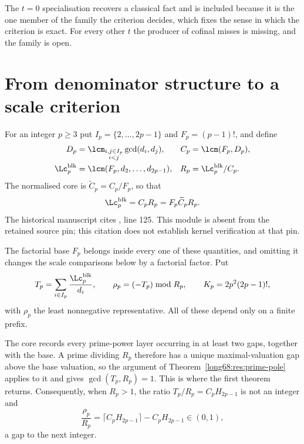 The $t=0$ specialisation recovers a classical fact and is included because it
is the one member of the family the criterion decides, which fixes the sense
in which the criterion is exact.  For every other $t$ the
producer of cofinal misses is missing, and the family is open.

\section{From denominator structure to a scale criterion}\label{long68:sec:residue}

For an integer $p\ge3$ put $I_p=\{2,\ldots,2p-1\}$ and $F_p=(p-1)!$, and
define
\begin{align*}
 D_p&=\lcm_{\substack{i,j\in I_p\\ i<j}}\gcd(d_i,d_j),
 &C_p&=\lcm(F_p,D_p),\\
 \Lc^{\mathrm{blk}}_p&=\lcm(F_p,d_2,\ldots,d_{2p-1}),
 &R_p&=\Lc^{\mathrm{blk}}_p/C_p .
\end{align*}
The normalised core is $\widetilde C_p=C_p/F_p$, so that
\begin{equation}\label{long68:eq:core-normalisation}
 \Lc^{\mathrm{blk}}_p=C_pR_p=F_p\widetilde C_pR_p .
\end{equation}
  The historical manuscript cites , line 125. This module is absent from the retained source pin; this citation does not establish kernel verification at that pin.

The factorial base $F_p$ belongs inside every one of these quantities, and
omitting it changes the scale comparisons below by a factorial factor.  Put
\[
 T_p=\sum_{i\in I_p}\frac{\Lc^{\mathrm{blk}}_p}{d_i},\qquad
 \rho_p=(-T_p)\bmod R_p,\qquad
 K_p=2p^2(2p-1)! ,
\]
with $\rho_p$ the least nonnegative representative.  All of these depend only
on a finite prefix.

The core records every prime-power layer occurring in at least two gaps,
together with the base.  A prime dividing $R_p$ therefore has a unique
maximal-valuation gap above the base valuation, so the argument of
Theorem~\ref{long68:res:prime-pole} applies to it and gives $\gcd(T_p,R_p)=1$.  This
is where the first theorem returns.  Consequently, when $R_p>1$, the ratio
$T_p/R_p=C_pH_{2p-1}$ is not an integer and
\begin{equation}\label{long68:eq:gap-normalisation}
 \frac{\rho_p}{R_p}
 =\bigl\lceil C_pH_{2p-1}\bigr\rceil-C_pH_{2p-1}\in(0,1),
\end{equation}
a gap to the next integer.

